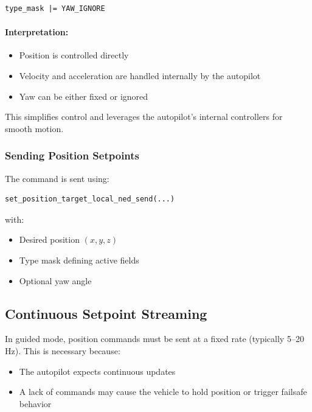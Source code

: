 \begin{verbatim}
type_mask |= YAW_IGNORE
\end{verbatim}

\paragraph{Interpretation:}

\begin{itemize}
    \item Position is controlled directly
    \item Velocity and acceleration are handled internally by the autopilot
    \item Yaw can be either fixed or ignored
\end{itemize}

This simplifies control and leverages the autopilot’s internal controllers for smooth motion.

\subsubsection{Sending Position Setpoints}

The command is sent using:

\begin{verbatim}
set_position_target_local_ned_send(...)
\end{verbatim}

with:
\begin{itemize}
    \item Desired position $(x, y, z)$
    \item Type mask defining active fields
    \item Optional yaw angle
\end{itemize}

\subsection{Continuous Setpoint Streaming}

In guided mode, position commands must be sent at a fixed rate (typically 5–20 Hz). This is necessary because:

\begin{itemize}
    \item The autopilot expects continuous updates
    \item A lack of commands may cause the vehicle to hold position or trigger failsafe behavior
\end{itemize}


